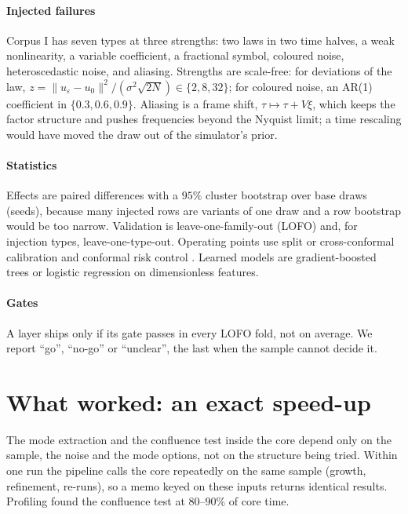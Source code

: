 \paragraph{Injected failures} Corpus I has seven types at three strengths: two laws in two time halves, a weak
nonlinearity, a variable coefficient, a fractional symbol, coloured noise, heteroscedastic noise, and aliasing. Strengths are scale-free:
for deviations of the law, $z=\lVert u_\varepsilon-u_0\rVert^2/(\sigma^2\sqrt{2N})\in\{2,8,32\}$; for coloured noise, an AR(1) coefficient in $\{0.3,0.6,0.9\}$.
Aliasing is a frame shift, $\tau\mapsto\tau+V\xi$, which keeps the factor structure and pushes frequencies beyond the Nyquist
limit; a time rescaling would have moved the draw out of the simulator's prior.

\paragraph{Statistics} Effects are paired differences with a $95\%$ cluster bootstrap over base draws (seeds), because many
injected rows are variants of one draw and a row bootstrap would be too narrow. Validation is leave-one-family-out (LOFO) and, for
injection types, leave-one-type-out. Operating points use split or cross-conformal calibration \cite{BarEtAl21} and
conformal risk control \cite{AngEtAl24}. Learned models are gradient-boosted trees \cite{Fri01} or logistic regression on
dimensionless features.

\paragraph{Gates} A layer ships only if its gate passes in every LOFO fold, not on average. We report ``go'', ``no-go'' or
``unclear'', the last when the sample cannot decide it.




\section{What worked: an exact speed-up}\label{sec:worked}
The mode extraction and the confluence test inside the core depend only on the sample, the noise and the mode options, not on
the structure being tried. Within one run the pipeline calls the core repeatedly on the same sample (growth, refinement,
re-runs), so a memo keyed on these inputs returns identical results. Profiling found the confluence test at $80$--$90\%$ of core
time.

